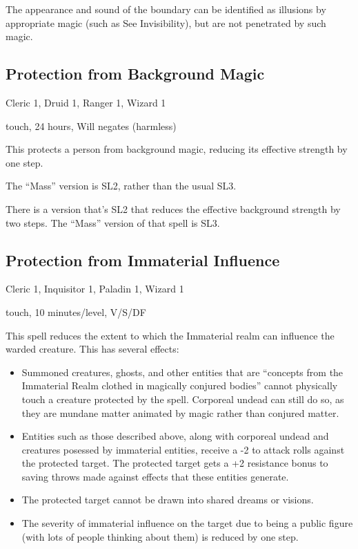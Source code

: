 The appearance and sound of the boundary can be identified as illusions by
appropriate magic (such as See Invisibility), but are not penetrated by
such magic.
%

%
\subsection{Protection from Background Magic}

Cleric 1, Druid 1, Ranger 1, Wizard 1

touch, 24 hours, Will negates (harmless)

This protects a person from background magic, reducing its effective
strength by one step.

The ``Mass'' version is SL2, rather than the usual SL3.

There is a version that's SL2 that reduces the effective background
strength by two steps. The ``Mass'' version of that spell is SL3.
%

%
\subsection{Protection from Immaterial Influence}

Cleric 1, Inquisitor 1, Paladin 1, Wizard 1

touch, 10 minutes/level, V/S/DF

This spell reduces the extent to which the Immaterial realm can influence
the warded creature. This has several effects:

\begin{itemize}
%
\item Summoned creatures, ghosts, and other entities that are ``concepts
from the Immaterial Realm clothed in magically conjured bodies'' cannot
physically touch a creature protected by the spell. Corporeal undead can
still do so, as they are mundane matter animated by magic rather than
conjured matter.
%
\item Entities such as those described above, along with corporeal undead
and creatures posessed by immaterial entities, receive a -2 to attack rolls
against the protected target. The protected target gets a +2 resistance
bonus to saving throws made against effects that these entities generate.
%
\item The protected target cannot be drawn into shared dreams or visions.
%
\item The severity of immaterial influence on the target due to being a
public figure (with lots of people thinking about them) is reduced by one
step.
%
\end{itemize}

